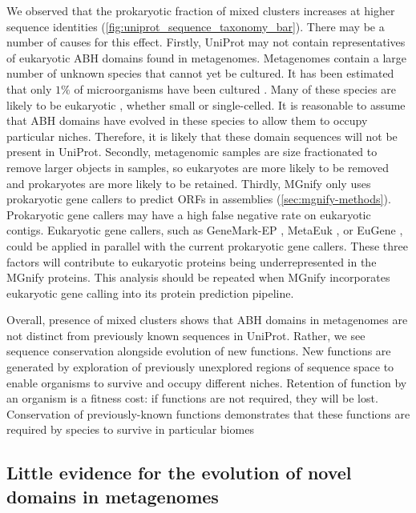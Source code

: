 We observed that the prokaryotic fraction of mixed clusters increases at higher sequence identities (\ref{fig:uniprot_sequence_taxonomy_bar}). There may be a number of causes for this effect. Firstly, UniProt may not contain representatives of eukaryotic ABH domains found in metagenomes. Metagenomes contain a large number of unknown species that cannot yet be cultured. It has been estimated that only $1\%$ of microorganisms have been cultured \cite{Rinke2013}. Many of these species are likely to be eukaryotic \cite{Saary2019}, whether small or single-celled. It is reasonable to assume that ABH domains have evolved in these species to allow them to occupy particular niches. Therefore, it is likely that these domain sequences will not be present in UniProt. Secondly, metagenomic samples are size fractionated to remove larger objects in samples, so eukaryotes are more likely to be removed and prokaryotes are more likely to be retained. Thirdly, MGnify only uses prokaryotic gene callers to predict ORFs in assemblies (\ref{sec:mgnify-methods}). Prokaryotic gene callers may have a high false negative rate on eukaryotic contigs. Eukaryotic gene callers, such as GeneMark-EP \cite{Bruna2020}, MetaEuk \cite{LevyKarin2020}, or EuGene \cite{Sallet2019}, could be applied in parallel with the current prokaryotic gene callers. These three factors will contribute to eukaryotic proteins being underrepresented in the MGnify proteins. This analysis should be repeated when MGnify incorporates eukaryotic gene calling into its protein prediction pipeline.

Overall, presence of mixed clusters shows that ABH domains in metagenomes are not distinct from previously known sequences in UniProt. Rather, we see sequence conservation alongside evolution of new functions. New functions are generated by exploration of previously unexplored regions of sequence space to enable organisms to survive and occupy different niches. Retention of function by an organism is a fitness cost: if functions are not required, they will be lost. Conservation of previously-known functions demonstrates that these functions are required by species to survive in particular biomes

\subsection{Little evidence for the evolution of novel domains in metagenomes}

